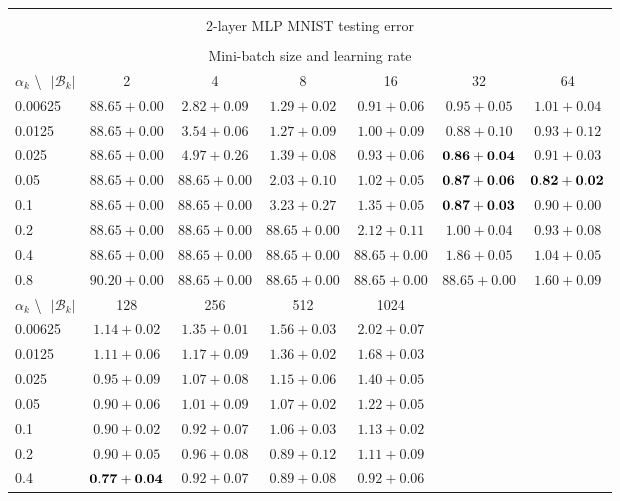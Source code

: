 \documentclass[10pt,journal,compsoc]{IEEEtran}
\begin{document}
\begin{table*}[!htbp]
\begin{center}
{\begin{tabular}{|l|c|c|c|c|c|c|}
\multicolumn{7}{|c|}{} \\
\multicolumn{7}{|c|}{2-layer MLP MNIST testing error} \\
\multicolumn{7}{|c|}{} \\
\hline
\multicolumn{7}{|c|}{Mini-batch size and learning rate} \\
\hline
$\alpha_k$ \textbackslash $ \text{   } {|\mathcal{B}_k|}$ & 2 & 4 & 8 & 16 & 32 & 64 \\
\hline
0.00625 & $88.65+0.00$ & $2.82+0.09$ & $1.29+0.02$ & $0.91+0.06$ & $0.95+0.05$ & $1.01+0.04$  \\
\hline
0.0125 & $88.65+0.00$ & $3.54+0.06$ & $1.27+0.09$ & $1.00+0.09$ & $0.88+0.10$ & $0.93+0.12$  \\
\hline
0.025 & $88.65+0.00$ & $4.97+0.26$ & $1.39+0.08$ & $0.93+0.06$ & $\bf 0.86+0.04$ & $0.91+0.03$  \\
\hline
0.05  & $88.65+0.00$ & $88.65+0.00$ & $2.03+0.10$ & $1.02+0.05$ & $\bf 0.87+0.06$ & $\bf 0.82+0.02$  \\
\hline
0.1   & $88.65+0.00$ & $88.65+0.00$ & $3.23+0.27$ & $1.35+0.05$ & $\bf 0.87+0.03$ & $0.90+0.00$  \\
\hline
0.2   & $88.65+0.00$ & $88.65+0.00$ & $88.65+0.00$ & $2.12+0.11$ & $1.00+0.04$ & $0.93+0.08$  \\
\hline
0.4   & $88.65+0.00$ & $88.65+0.00$ & $88.65+0.00$ & $88.65+0.00$ & $1.86+0.05$ & $1.04+0.05$  \\
\hline
0.8   & $90.20+0.00$ & $88.65+0.00$ & $88.65+0.00$ & $88.65+0.00$ & $88.65+0.00$ & $1.60+0.09$ \\
\hline
$\alpha_k$ \textbackslash $\text{   } {|\mathcal{B}_k|}$ & 128 & 256 & 512 & 1024 & & \\
\hline
0.00625 & $1.14+0.02$ & $1.35+0.01$ & $1.56+0.03$ & $2.02+0.07$ & &  \\
\hline
0.0125 & $1.11+0.06$ & $1.17+0.09$ & $1.36+0.02$ & $1.68+0.03$ & &  \\
\hline
0.025 & $0.95+0.09$ & $1.07+0.08$ & $1.15+0.06$ & $1.40+0.05$ & &  \\
\hline
0.05  & $0.90+0.06$ & $1.01+0.09$ & $1.07+0.02$ & $1.22+0.05$ & &  \\
\hline
0.1   & $0.90+0.02$ & $0.92+0.07$ & $1.06+0.03$ & $1.13+0.02$ & &  \\
\hline
0.2   & $0.90+0.05$ & $0.96+0.08$ & $0.89+0.12$ & $1.11+0.09$ & &  \\
\hline
0.4   & $\bf 0.77+0.04$ & $0.92+0.07$ & $0.89+0.08$ & $0.92+0.06$ & &  \\
\hline

\end{tabular}}
\end{center}
\end{table*}
\end{document}
